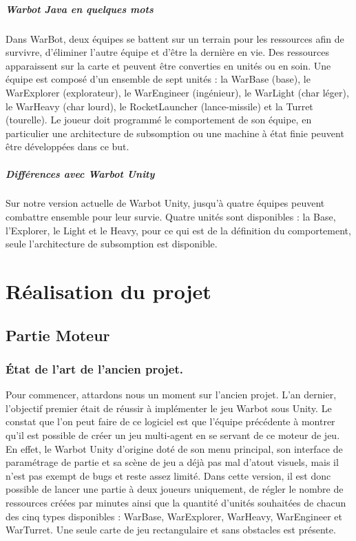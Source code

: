 \documentclass{report}
\begin{document}
\paragraph{}
\subsubsection{Warbot Java en quelques mots}
Dans WarBot, deux équipes se battent sur un terrain pour les ressources afin de survivre, d'éliminer l'autre équipe et d’être la dernière en vie. Des ressources apparaissent sur la carte et peuvent être converties en unités ou en soin.
\newline Une équipe est composé d'un ensemble de sept unités :  la WarBase (base), le WarExplorer (explorateur), le WarEngineer (ingénieur), le WarLight (char léger), le WarHeavy (char lourd), le RocketLauncher (lance-missile) et la Turret (tourelle). 
\newline Le joueur doit programmé le comportement de son équipe, en particulier une architecture de subsomption ou une machine à état finie peuvent être développées dans ce but.

\subsubsection{Différences avec Warbot Unity}
Sur notre version actuelle de Warbot Unity, jusqu'à quatre équipes peuvent combattre ensemble pour leur survie. Quatre unités sont disponibles : la Base, l'Explorer, le Light et le Heavy, pour ce qui est de la définition du comportement, seule l'architecture de subsomption est disponible.

\newpage
\part{Réalisation du projet}
\newpage

\chapter{Partie Moteur}

\section{État de l'art de l'ancien projet.}

Pour commencer, attardons nous un moment sur l'ancien projet. L'an dernier, l'objectif premier était de réussir à implémenter le jeu Warbot sous Unity. Le constat que l'on peut faire de ce logiciel est que l'équipe précédente à montrer qu'il est possible de créer un jeu multi-agent en se servant de ce moteur de jeu.
En effet, le Warbot Unity d'origine doté de son menu principal, son interface de paramétrage de partie et sa scène de jeu a déjà pas mal d'atout visuels, mais il n'est pas exempt de bugs et reste assez limité.
Dans cette version, il est donc possible de lancer une partie à deux joueurs uniquement, de régler le nombre de ressources créées par minutes ainsi que la quantité d'unités souhaitées de chacun des cinq types disponibles : WarBase, WarExplorer, WarHeavy, WarEngineer et WarTurret. Une seule carte de jeu rectangulaire et sans obstacles est présente. 
\end{document}
